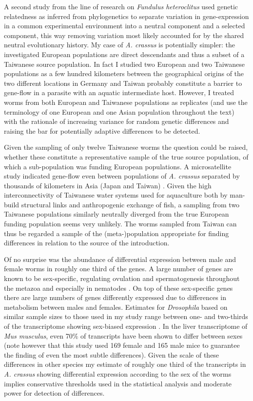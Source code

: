 A second study from the line of research on \textit{Fundulus
  heteroclitus} \cite{pmid16567645} used genetic relatedness as
inferred from phylogenetics to separate variation in gene-expression
in a common experimental environment into a neutral component and a
selected component, this way removing variation most likely accounted
for by the shared neutral evolutionary history. My case of
\textit{A. crassus} is potentially simpler: the investigated European
populations are direct descendants and thus a subset of a Taiwanese
source population. In fact I studied two European and two Taiwanese
populations as a few hundred kilometers between the geographical
origins of the two different locations in Germany and Taiwan probably
constitute a barrier to gene-flow in a parasite with an aquatic
intermediate host. However, I treated worms from both European and
Taiwanese populations as replicates (and use the terminology of one
European and one Asian population throughout the text) with the
rationale of increasing variance for random genetic differences and
raising the bar for potentially adaptive differences to be detected.

Given the sampling of only twelve Taiwanese worms the question could
be raised, whether these constitute a representative sample of the
true source population, of which a sub-population was funding European
populations. A microsatellite study indicated gene-flow even between
populations of \textit{A. crassus} separated by thousands of
kilometers in Asia (Japan and Taiwan)
\cite{wielgoss_population_2008}. Given the high interconnectivity of
Taiwanese water systems used for aquaculture both by man-build
structural links and anthropogenic exchange of fish, a sampling from
two Taiwanese populations similarly neutrally diverged from the true
European funding population seems very unlikely. The worms sampled
from Taiwan can thus be regarded a sample of the (meta-)population
appropriate for finding differences in relation to the source of the
introduction.

Of no surprise was the abundance of differential expression between
male and female worms in roughly one third of the genes. A large
number of genes are known to be sex-specific, regulating ovulation and
spermatogenesis throughout the metazoa and especially in nematodes
\cite{pmid15371532}. On top of these sex-specific genes there are
large numbers of genes differently expressed due to differences in
metabolism between males and females. Estimates for
\textit{Drosophila} based on similar sample sizes to those used in my
study range between one- and two-thirds of the transcriptome showing
sex-biased expression \cite{pmid11726925}. In the liver transcriptome
of \textit{Mus musculus}, even 70\% of transcripts have been shown to
differ between sexes \cite{pmid16825664} (note however that this study
used 169 female and 165 male mice to guarantee the finding of even the
most subtle differences). Given the scale of these differences in
other species my estimate of roughly one third of the transcripts in
\textit{A. crassus} showing differential expression according to the
sex of the worms implies conservative thresholds used in the
statistical analysis and moderate power for detection of differences.

